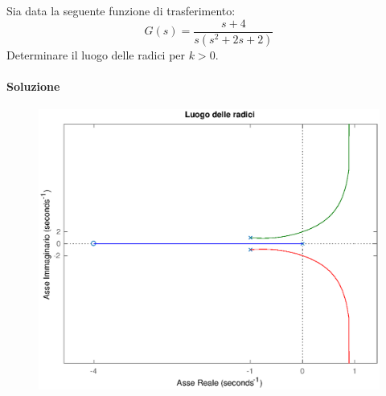 \begin{esercizio}
Sia data la seguente funzione di trasferimento:
\[
	G(s) = \frac{s+4}{s(s^2+2s+2)}
\]
Determinare il luogo delle radici per \(k>0\).

\paragraph{Soluzione}

\begin{figure}[ht]
	\centering
	\includegraphics[scale=.6]{mod1/assets/rl_ex312}
\end{figure}


\end{esercizio}
